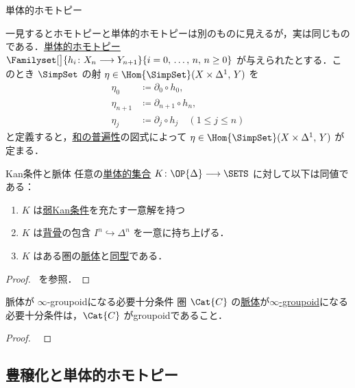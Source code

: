 \documentclass[TQFT_main]{subfiles}
\begin{document}
\begin{mydef}[label=def:SimpSet-homotopic]{単体的ホモトピー}
\end{mydef}

一見するとホモトピーと単体的ホモトピーは別のものに見えるが，実は同じものである．\hyperref[def:SimpSet-homotopy]{単体的ホモトピー} $\Familyset[\big]{h_i \colon X_n \lto Y_{n+1}}{i = 0,\, \dots,\, n,\, n \ge 0}$ が与えられたとする．このとき $\SimpSet$ の射 $\eta \in \Hom{\SimpSet}(X \times \Delta^1,\, Y)$ を
\begin{align}
    \eta_0 &\coloneqq \partial_0 \circ h_0, \\
    \eta_{n+1} &\coloneqq \partial_{n+1} \circ h_n, \\
    \eta_j &\coloneqq \partial_j \circ h_{j} \quad (1\le j \le n)
\end{align}
と定義すると，\hyperref[def:colim]{和の普遍性}の図式によって $\eta \in \Hom{\SimpSet}(X \times \Delta^1,\, Y)$ が定まる．

\begin{mytheo}[label=thm:KanCplx]{Kan条件と脈体}
    任意の\hyperref[def:simplicial-sets]{単体的集合} $K \colon \OP{\Delta} \lto \SETS$ に対して以下は同値である：
    \begin{enumerate}
        \item $K$ は\hyperref[def:KanCplx]{弱Kan条件}を充たす一意解を持つ
        \item $K$ は\hyperref[def:horn]{背骨}の包含 $I^n \hookrightarrow \Delta^n$ を一意に持ち上げる．
        \item $K$ はある圏の\hyperref[def:nerve]{脈体}と\hyperref[def:iso]{同型}である．
    \end{enumerate}
\end{mytheo}

\begin{proof}
    ~\cite[p.20, Theorem 1.1.52]{Land2021infinity}を参照．
\end{proof}

\begin{myprop}[label=prop:nerve]{脈体が $\infty$-groupoidになる必要十分条件}
    圏 $\Cat{C}$ の\hyperref[def:nerve]{脈体}が\hyperref[def:infinity-1]{$\infty$-groupoid}になる必要十分条件は，$\Cat{C}$ がgroupoidであること．
\end{myprop}

\begin{proof}
    ~\cite[p.23, Lemma 1.1.54]{Land2021infinity}
\end{proof}

\subsection{豊穣化と単体的ホモトピー}
\end{document}
